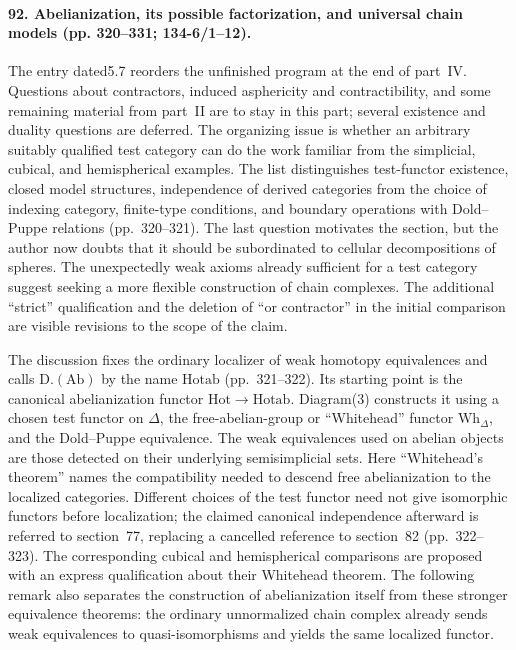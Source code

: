 \paragraph{92. Abelianization, its possible factorization, and universal chain models (pp. 320--331; 134-6/1--12).}
The entry dated5.7 reorders the unfinished program at the end of part~IV. Questions about contractors, induced asphericity and contractibility, and some remaining material from part~II are to stay in this part; several existence and duality questions are deferred. The organizing issue is whether an arbitrary suitably qualified test category can do the work familiar from the simplicial, cubical, and hemispherical examples. The list distinguishes test-functor existence, closed model structures, independence of derived categories from the choice of indexing category, finite-type conditions, and boundary operations with Dold--Puppe relations (pp.~320--321). The last question motivates the section, but the author now doubts that it should be subordinated to cellular decompositions of spheres. The unexpectedly weak axioms already sufficient for a test category suggest seeking a more flexible construction of chain complexes. The additional ``strict'' qualification and the deletion of ``or contractor'' in the initial comparison are visible revisions to the scope of the claim.

The discussion fixes the ordinary localizer of weak homotopy equivalences and calls $\mathrm{D.}(\mathrm{Ab})$ by the name $\mathrm{Hotab}$ (pp.~321--322). Its starting point is the canonical abelianization functor $\mathrm{Hot}\to\mathrm{Hotab}$. Diagram(3) constructs it using a chosen test functor on $\Delta$, the free-abelian-group or ``Whitehead'' functor $\mathrm{Wh}_{\Delta}$, and the Dold--Puppe equivalence. The weak equivalences used on abelian objects are those detected on their underlying semisimplicial sets. Here ``Whitehead's theorem'' names the compatibility needed to descend free abelianization to the localized categories. Different choices of the test functor need not give isomorphic functors before localization; the claimed canonical independence afterward is referred to section~77, replacing a cancelled reference to section~82 (pp.~322--323). The corresponding cubical and hemispherical comparisons are proposed with an express qualification about their Whitehead theorem. The following remark also separates the construction of abelianization itself from these stronger equivalence theorems: the ordinary unnormalized chain complex already sends weak equivalences to quasi-isomorphisms and yields the same localized functor.


